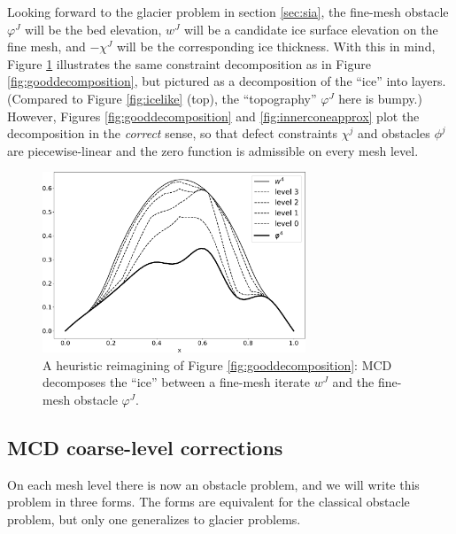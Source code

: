 \documentclass[letterpaper,final,12pt,reqno]{amsart}
\theoremstyle{claim}
\numberwithin{equation}{section}
\numberwithin{figure}{section}
\numberwithin{table}{section}
\numberwithin{theorem}{section}
\begin{document}
Looking forward to the glacier problem in section \ref{sec:sia}, the fine-mesh obstacle $\varphi^J$ will be the bed elevation, $w^J$ will be a candidate ice surface elevation on the fine mesh, and $-\chi^J$ will be the corresponding ice thickness.  With this in mind, Figure \ref{fig:icelikedecomposition} illustrates the same constraint decomposition as in Figure \ref{fig:gooddecomposition}, but pictured as a decomposition of the ``ice'' into layers.  (Compared to Figure \ref{fig:icelike} (top), the ``topography'' $\varphi^J$ here is bumpy.)  However, Figures \ref{fig:gooddecomposition} and \ref{fig:innerconeapprox} plot the decomposition in the \emph{correct} sense, so that defect constraints $\chi^j$ and obstacles $\phi^j$ are piecewise-linear and the zero function is admissible on every mesh level.

\begin{figure}
\includegraphics[width=0.7\textwidth]{fixfigs/icedec_defect.pdf}
\caption{A heuristic reimagining of Figure \ref{fig:gooddecomposition}: MCD decomposes the ``ice'' between a fine-mesh iterate $w^J$ and the fine-mesh obstacle $\varphi^J$.}
\label{fig:icelikedecomposition}
\end{figure}

\subsection*{MCD coarse-level corrections}  On each mesh level there is now an obstacle problem, and we will write this problem in three forms.  The forms are equivalent for the classical obstacle problem, but only one generalizes to glacier problems.
\end{document}

